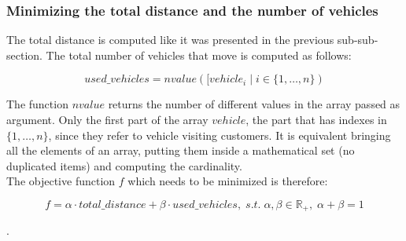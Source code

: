 \documentclass[../main.tex]{subfiles}
\begin{document}
\subsubsection{Minimizing the total distance and the number of vehicles}
The total distance is computed like it was presented in the previous sub-sub-section. The total number of vehicles that move is computed as follows:
\begin{center}
    \begin{equation}
        used\_vehicles = nvalue([vehicle_i \; | \; i \in \{1,\dots,n\})
    \end{equation}
\end{center}
The function $nvalue$ returns the number of different values in the array passed as argument.
Only the first part of the array $vehicle$, the part that has indexes in $\{1,\dots,n\}$, since they refer to vehicle visiting customers.
It is equivalent bringing all the elements of an array, putting them inside a mathematical set (no duplicated items) and computing the cardinality.\\
The objective function $f$ which needs to be minimized is therefore:
\begin{center}
    \begin{equation}
        f = \alpha{} \cdot total\_distance + \beta{} \cdot used\_vehicles, \; s.t. \; \alpha{}, \beta{} \in \mathbb{R}_+, \; \alpha{} + \beta{} = 1
    \end{equation}
\end{center}.
\end{document}
